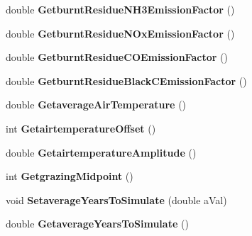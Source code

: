 \begin{DoxyCompactItemize}
double {\bfseries Getburnt\+Residue\+N\+H3\+Emission\+Factor} ()
\item 
\mbox{\label{struct_global_vars_1_1zone_specific_data_a9fe78215b1675b96357f91238e6b4995}} 
double {\bfseries Getburnt\+Residue\+N\+Ox\+Emission\+Factor} ()
\item 
\mbox{\label{struct_global_vars_1_1zone_specific_data_a1541c28751b72a49b5682656767b8c7c}} 
double {\bfseries Getburnt\+Residue\+C\+O\+Emission\+Factor} ()
\item 
\mbox{\label{struct_global_vars_1_1zone_specific_data_affd0301d1e72fbef68b346988765e5e5}} 
double {\bfseries Getburnt\+Residue\+Black\+C\+Emission\+Factor} ()
\item 
\mbox{\label{struct_global_vars_1_1zone_specific_data_a8090a944d3457c9078ef4c143591657a}} 
double {\bfseries Getaverage\+Air\+Temperature} ()
\item 
\mbox{\label{struct_global_vars_1_1zone_specific_data_af1bd37d9f4d31ce45a6b258c17c61ee8}} 
int {\bfseries Getairtemperature\+Offset} ()
\item 
\mbox{\label{struct_global_vars_1_1zone_specific_data_abe8d04141904b2f25c221ff6e61baa85}} 
double {\bfseries Getairtemperature\+Amplitude} ()
\item 
\mbox{\label{struct_global_vars_1_1zone_specific_data_a7e40be9be3646dc302271d6696af70c7}} 
int {\bfseries Getgrazing\+Midpoint} ()
\item 
\mbox{\label{struct_global_vars_1_1zone_specific_data_a9d9c7918bc0060def3f43f5225943c88}} 
void {\bfseries Setaverage\+Years\+To\+Simulate} (double a\+Val)
\item 
\mbox{\label{struct_global_vars_1_1zone_specific_data_a07113789f9a899a461491840759674c4}} 
double {\bfseries Getaverage\+Years\+To\+Simulate} ()

\end{DoxyCompactItemize}
